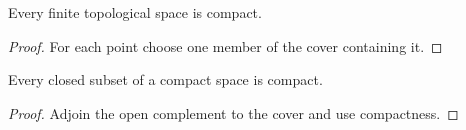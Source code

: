 \begin{theorem}\label{finite}
Every finite topological space is compact.
\end{theorem}
\begin{proof}For each point choose one member of the cover containing it.\end{proof}

\begin{theorem}\label{closed}
Every closed subset of a compact space is compact.
\end{theorem}
\begin{proof}Adjoin the open complement to the cover and use compactness.\end{proof}
